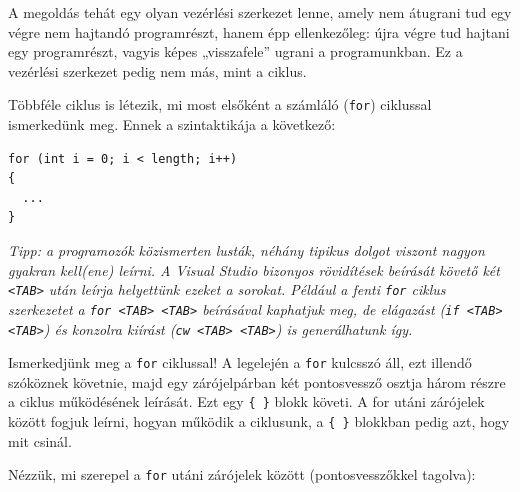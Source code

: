 \documentclass[a4paper]{article}
\begin{document}
A megoldás tehát egy olyan vezérlési szerkezet lenne, amely nem átugrani tud egy végre nem hajtandó programrészt, hanem épp ellenkezőleg: újra végre tud hajtani egy programrészt, vagyis képes „visszafele” ugrani a programunkban. Ez a vezérlési szerkezet pedig nem más, mint a ciklus.

Többféle ciklus is létezik, mi most elsőként a számláló (\lstinline{for}) ciklussal ismerkedünk meg. Ennek a szintaktikája a következő:

\begin{lstlisting}[caption=Számláló ciklus, label=lst:for]
for (int i = 0; i < length; i++)
{
  ...
}
\end{lstlisting}

\emph{Tipp: a programozók közismerten lusták, néhány tipikus dolgot viszont nagyon gyakran kell(ene) leírni. A Visual Studio bizonyos rövidítések beírását követő két \lstinline{<TAB>} után leírja helyettünk ezeket a sorokat. Például a fenti \lstinline{for} ciklus szerkezetet a \lstinline{for <TAB> <TAB>} beírásával kaphatjuk meg, de elágazást (\lstinline{if <TAB> <TAB>}) és konzolra kiírást (\lstinline{cw <TAB> <TAB>}) is generálhatunk így.}

Ismerkedjünk meg a \lstinline{for} ciklussal! A legelején a \lstinline{for} kulcsszó áll, ezt illendő szóköznek követnie, majd egy zárójelpárban két pontosvessző osztja három részre a ciklus működésének leírását. Ezt egy \lstinline!{ }! blokk követi. A for utáni zárójelek között fogjuk leírni, hogyan működik a ciklusunk, a \lstinline!{ }! blokkban pedig azt, hogy mit csinál.

Nézzük, mi szerepel a \lstinline{for} utáni zárójelek között (pontosvesszőkkel tagolva):
\end{document}
